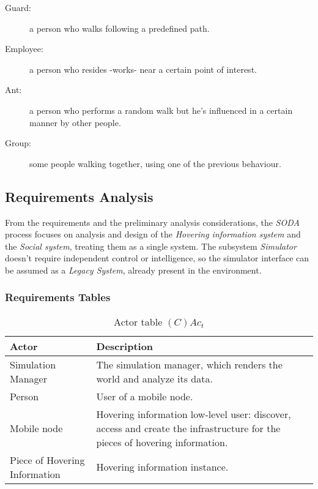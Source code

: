 \begin{description}
	\item[Guard:] a person who walks following a predefined path.
	\item[Employee:] a person who resides -works- near a certain point of interest.
	\item[Ant:] a person who performs a random walk but he's influenced in a
		certain manner by other people.
	\item[Group:] some people walking together, using one of the previous
		behaviour.
\end{description}

\subsection{Requirements Analysis}

From the requirements and the preliminary analysis considerations, the
\emph{SODA} process focuses on analysis and design of the \emph{Hovering
information system} and the \emph{Social system}, treating them as a single
system. The subsystem \emph{Simulator} doesn't require independent control or
intelligence, so the simulator interface can be assumed as a \emph{Legacy
System}, already present in the environment.

\subsubsection{Requirements Tables}

\begin{table}[H]
	\centering
	\begin{tabular}{|p{4cm}|p{8cm}|}
			\hline
			\textbf{Actor} & \textbf{Description} \\
			\hline
      Simulation Manager & The simulation manager, which renders the world and
      analyze its data. \\
			\hline
			Person & User of a mobile node. \\
			\hline
			Mobile node & Hovering information low-level user: discover, access and
			create the infrastructure for the pieces of hovering information. \\
			\hline
			Piece of Hovering Information & Hovering information instance. \\
			\hline
		\end{tabular}
	\caption{Actor table $(C)Ac_t$}
	\label{tab:cact}
\end{table}

